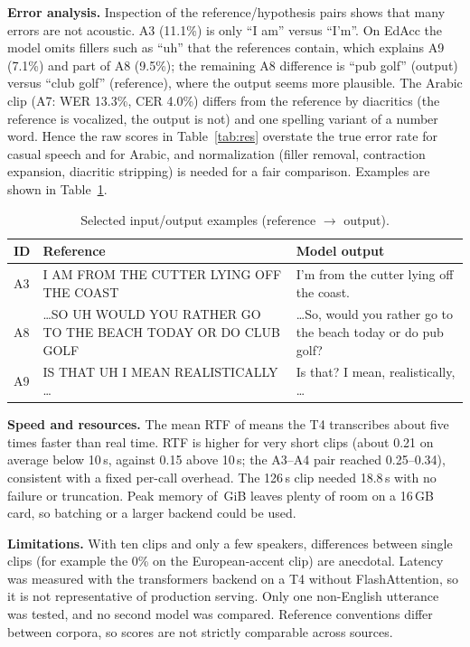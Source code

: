 \documentclass[conference]{IEEEtran}
\begin{document}
\textbf{Error analysis.} Inspection of the reference/hypothesis pairs shows that many errors are not acoustic. A3 (11.1\%) is only ``I am'' versus ``I'm''. On EdAcc the model omits fillers such as ``uh'' that the references contain, which explains A9 (7.1\%) and part of A8 (9.5\%); the remaining A8 difference is ``pub golf'' (output) versus ``club golf'' (reference), where the output seems more plausible. The Arabic clip (A7: WER 13.3\%, CER 4.0\%) differs from the reference by diacritics (the reference is vocalized, the output is not) and one spelling variant of a number word. Hence the raw scores in Table~\ref{tab:res} overstate the true error rate for casual speech and for Arabic, and normalization (filler removal, contraction expansion, diacritic stripping) is needed for a fair comparison. Examples are shown in Table~\ref{tab:io}.

\begin{table}[t]\centering\caption{Selected input/output examples (reference $\rightarrow$ output).}\label{tab:io}\scriptsize
\begin{tabular}{@{}p{0.5cm}p{3.1cm}p{3.1cm}@{}}\toprule
ID & Reference & Model output\\\midrule
A3 & I AM FROM THE CUTTER LYING OFF THE COAST & I'm from the cutter lying off the coast.\\
A8 & \ldots SO UH WOULD YOU RATHER GO TO THE BEACH TODAY OR DO CLUB GOLF & \ldots So, would you rather go to the beach today or do pub golf?\\
A9 & IS THAT UH I MEAN REALISTICALLY \ldots & Is that? I mean, realistically, \ldots\\\bottomrule
\end{tabular}\end{table}

\textbf{Speed and resources.} The mean RTF of \meanrtf{} means the T4 transcribes about five times faster than real time. RTF is higher for very short clips (about 0.21 on average below 10\,s, against 0.15 above 10\,s; the A3--A4 pair reached 0.25--0.34), consistent with a fixed per-call overhead. The 126\,s clip needed 18.8\,s with no failure or truncation. Peak memory of \vrampeak\,GiB leaves plenty of room on a 16\,GB card, so batching or a larger backend could be used.

\textbf{Limitations.} With ten clips and only a few speakers, differences between single clips (for example the 0\% on the European-accent clip) are anecdotal. Latency was measured with the transformers backend on a T4 without FlashAttention, so it is not representative of production serving. Only one non-English utterance was tested, and no second model was compared. Reference conventions differ between corpora, so scores are not strictly comparable across sources.
\end{document}
